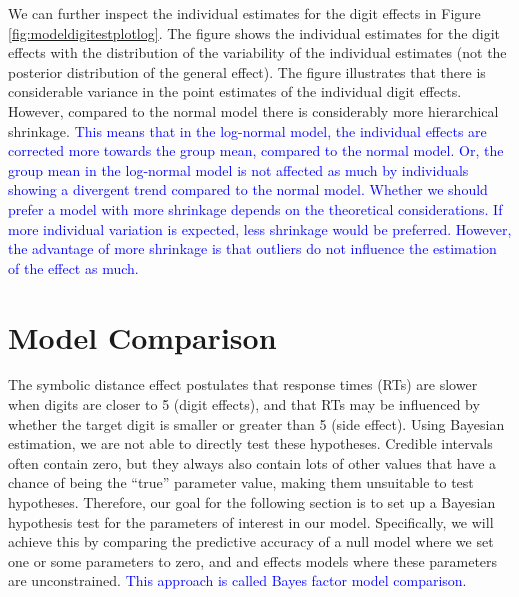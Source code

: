 \documentclass[
  english,
  doc,floatsintext]{apa6}
\begin{document}
We can further inspect the individual estimates for the digit effects in Figure \ref{fig:modeldigitestplotlog}. The figure shows the individual estimates for the digit effects with the distribution of the variability of the individual estimates (not the posterior distribution of the general effect). The figure illustrates that there is considerable variance in the point estimates of the individual digit effects. However, compared to the normal model there is considerably more hierarchical shrinkage. \textcolor{blue}{This means that in the log-normal model, the individual effects are corrected more towards the group mean, compared to the normal model. Or, the group mean in the log-normal model is not affected as much by individuals showing a divergent trend compared to the normal model. Whether we should prefer a model with more shrinkage depends on the theoretical considerations. If more individual variation is expected, less shrinkage would be preferred. However, the advantage of more shrinkage is that outliers do not influence the estimation of the effect as much. }

\hypertarget{model-comparison}{%
\section{Model Comparison}\label{model-comparison}}

The symbolic distance effect postulates that response times (RTs) are slower when digits are closer to 5 (digit effects), and that RTs may be influenced by whether the target digit is smaller or greater than 5 (side effect). Using Bayesian estimation, we are not able to directly test these hypotheses. Credible intervals often contain zero, but they always also contain lots of other values that have a chance of being the ``true'' parameter value, making them unsuitable to test hypotheses. Therefore, our goal for the following section is to set up a Bayesian hypothesis test for the parameters of interest in our model. Specifically, we will achieve this by comparing the predictive accuracy of a null model where we set one or some parameters to zero, and and effects models where these parameters are unconstrained. \textcolor{blue}{This approach is called Bayes factor model comparison.}
\end{document}

